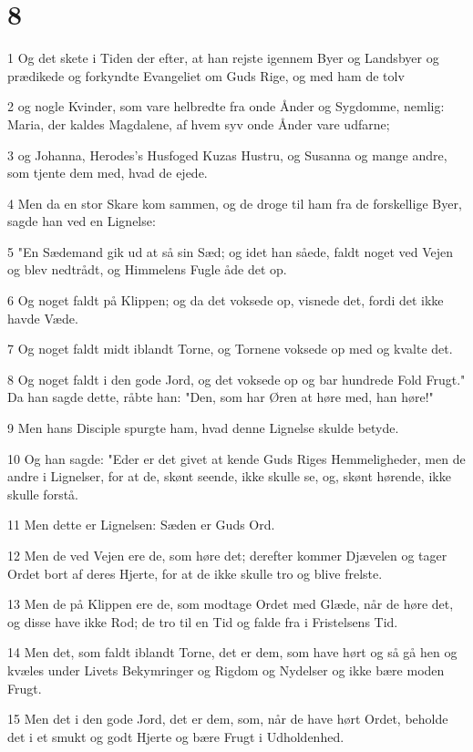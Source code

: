 \chapter{8}

\par 1 Og det skete i Tiden der efter, at han rejste igennem Byer og Landsbyer og prædikede og forkyndte Evangeliet om Guds Rige, og med ham de tolv
\par 2 og nogle Kvinder, som vare helbredte fra onde Ånder og Sygdomme, nemlig: Maria, der kaldes Magdalene, af hvem syv onde Ånder vare udfarne;
\par 3 og Johanna, Herodes's Husfoged Kuzas Hustru, og Susanna og mange andre, som tjente dem med, hvad de ejede.
\par 4 Men da en stor Skare kom sammen, og de droge til ham fra de forskellige Byer, sagde han ved en Lignelse:
\par 5 "En Sædemand gik ud at så sin Sæd; og idet han såede, faldt noget ved Vejen og blev nedtrådt, og Himmelens Fugle åde det op.
\par 6 Og noget faldt på Klippen; og da det voksede op, visnede det, fordi det ikke havde Væde.
\par 7 Og noget faldt midt iblandt Torne, og Tornene voksede op med og kvalte det.
\par 8 Og noget faldt i den gode Jord, og det voksede op og bar hundrede Fold Frugt." Da han sagde dette, råbte han: "Den, som har Øren at høre med, han høre!"
\par 9 Men hans Disciple spurgte ham, hvad denne Lignelse skulde betyde.
\par 10 Og han sagde: "Eder er det givet at kende Guds Riges Hemmeligheder, men de andre i Lignelser, for at de, skønt seende, ikke skulle se, og, skønt hørende, ikke skulle forstå.
\par 11 Men dette er Lignelsen: Sæden er Guds Ord.
\par 12 Men de ved Vejen ere de, som høre det; derefter kommer Djævelen og tager Ordet bort af deres Hjerte, for at de ikke skulle tro og blive frelste.
\par 13 Men de på Klippen ere de, som modtage Ordet med Glæde, når de høre det, og disse have ikke Rod; de tro til en Tid og falde fra i Fristelsens Tid.
\par 14 Men det, som faldt iblandt Torne, det er dem, som have hørt og så gå hen og kvæles under Livets Bekymringer og Rigdom og Nydelser og ikke bære moden Frugt.
\par 15 Men det i den gode Jord, det er dem, som, når de have hørt Ordet, beholde det i et smukt og godt Hjerte og bære Frugt i Udholdenhed.
